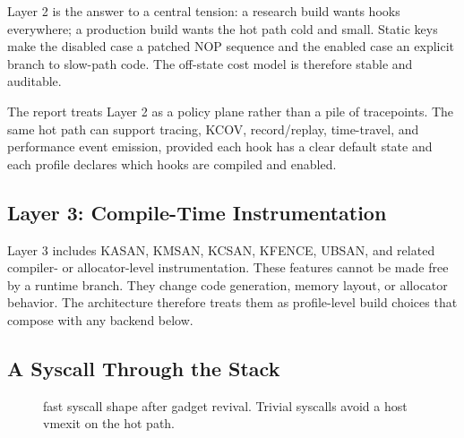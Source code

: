 Layer 2 is the answer to a central tension: a research build wants
hooks everywhere; a production build wants the hot path cold and
small. Static keys make the disabled case a patched NOP sequence and
the enabled case an explicit branch to slow-path code. The off-state
cost model is therefore stable and auditable.

The report treats Layer 2 as a policy plane rather than a pile of
tracepoints. The same hot path can support tracing, KCOV,
record/replay, time-travel, and performance event emission, provided
each hook has a clear default state and each profile declares which
hooks are compiled and enabled.

\subsection{Layer 3: Compile-Time Instrumentation}

Layer 3 includes KASAN, KMSAN, KCSAN, KFENCE, UBSAN, and related
compiler- or allocator-level instrumentation. These features cannot be
made free by a runtime branch. They change code generation, memory
layout, or allocator behavior. The architecture therefore treats them
as profile-level build choices that compose with any backend below.

\subsection{A Syscall Through the Stack}

\begin{figure}[h]
\centering
{}
\caption{\KVMvTwo{} fast syscall shape after gadget revival. Trivial syscalls avoid a host vmexit on the hot path.}
\end{figure}
